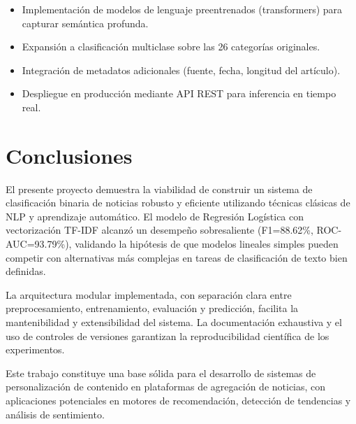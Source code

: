 \documentclass[12pt,a4paper]{article}
\begin{document}
\begin{itemize}
    \item Implementación de modelos de lenguaje preentrenados (transformers) para capturar semántica profunda.
    \item Expansión a clasificación multiclase sobre las 26 categorías originales.
    \item Integración de metadatos adicionales (fuente, fecha, longitud del artículo).
    \item Despliegue en producción mediante API REST para inferencia en tiempo real.
\end{itemize}

\section{Conclusiones}

El presente proyecto demuestra la viabilidad de construir un sistema de clasificación binaria de noticias robusto y eficiente utilizando técnicas clásicas de NLP y aprendizaje automático. El modelo de Regresión Logística con vectorización TF-IDF alcanzó un desempeño sobresaliente (F1=88.62\%, ROC-AUC=93.79\%), validando la hipótesis de que modelos lineales simples pueden competir con alternativas más complejas en tareas de clasificación de texto bien definidas.

La arquitectura modular implementada, con separación clara entre preprocesamiento, entrenamiento, evaluación y predicción, facilita la mantenibilidad y extensibilidad del sistema. La documentación exhaustiva y el uso de controles de versiones garantizan la reproducibilidad científica de los experimentos.

Este trabajo constituye una base sólida para el desarrollo de sistemas de personalización de contenido en plataformas de agregación de noticias, con aplicaciones potenciales en motores de recomendación, detección de tendencias y análisis de sentimiento.
\end{document}
